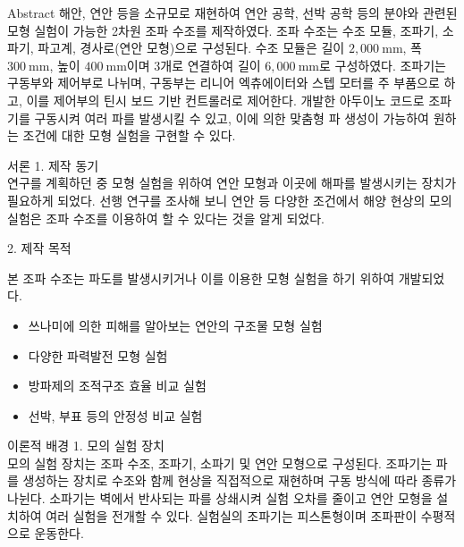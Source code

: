 \documentclass[a0paper,portrait]{Junlam_PosterP}
\begin{document}
\begin{poster}

\begin{posterbox}[name=abstra,column=0,row=0]{Abstract}
  \scriptsize{
  해안, 연안 등을 소규모로 재현하여 연안 공학, 선박 공학 등의 분야와 관련된 모형 실험이 가능한 2차원 조파 수조를 제작하였다. 조파 수조는 수조 모듈, 조파기, 소파기, 파고계, 경사로(연안 모형)으로 구성된다. 수조 모듈은 길이 $2,000~\mathrm{mm}$, 폭 $300~\mathrm{mm}$, 높이 $400~\mathrm{mm}$이며 3개로 연결하여 길이 $6,000~\mathrm{mm}$로 구성하였다. 조파기는 구동부와 제어부로 나뉘며, 구동부는 리니어 엑츄에이터와 스텝 모터를 주 부품으로 하고, 이를 제어부의 틴시 보드 기반 컨트롤러로 제어한다. 개발한 아두이노 코드로 조파기를 구동시켜 여러 파를 발생시킬 수 있고, 이에 의한 맞춤형 파 생성이 가능하여 원하는 조건에 대한 모형 실험을 구현할 수 있다.
  }
\end{posterbox}

\begin{posterbox}[name=intro,column=0,below=abstra]{서론}
    \small {1. 제작 동기 \\}
        \scriptsize {연구를 계획하던 중 모형 실험을 위하여 연안 모형과 이곳에 해파를 발생시키는 장치가 필요하게 되었다. 선행 연구를 조사해 보니 연안 등 다양한 조건에서 해양 현상의 모의 실험은 조파 수조를 이용하여 할 수 있다는 것을 알게 되었다\cite{chung2013}.\\}

    \small {2. 제작 목적} \\
        \scriptsize {본 조파 수조는 파도를 발생시키거나 이를 이용한 모형 실험을 하기 위하여 개발되었다. 
          \begin{itemize}
            \item 쓰나미에 의한 피해를 알아보는 연안의 구조물 모형 실험
            \item 다양한 파력발전 모형 실험
            \item 방파제의 조적구조 효율 비교 실험
            \item 선박, 부표 등의 안정성 비교 실험
          \end{itemize}
          }
        \end{posterbox}

\begin{posterbox}[name=theo,column=0,below=intro]{이론적 배경}
   \small {1. 모의 실험 장치\\} %
     \scriptsize {모의 실험 장치는 조파 수조, 조파기, 소파기 및 연안 모형으로 구성된다. 조파기는 파를 생성하는 장치로 수조와 함께 현상을 직접적으로 재현하며 구동 방식에 따라 종류가 나뉜다. 소파기는 벽에서 반사되는 파를 상쇄시켜 실험 오차를 줄이고 연안 모형을 설치하여 여러 실험을 전개할 수 있다. 실험실의 조파기는 피스톤형이며 조파판이 수평적으로 운동한다.\\}
     

\end{posterbox}
\end{poster}
\end{document}
